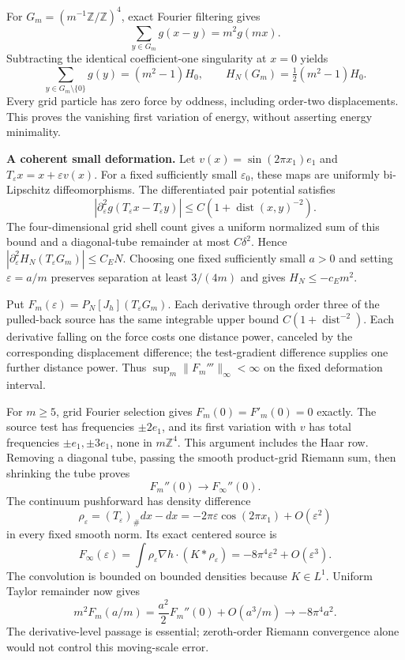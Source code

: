 \documentclass[11pt]{article}
\begin{document}
For $G_m=(m^{-1}\mathbb Z/\mathbb Z)^4$, exact Fourier filtering gives
\[
 \sum_{y\in G_m}g(x-y)=m^2g(mx).
\]
Subtracting the identical coefficient-one singularity at $x=0$ yields
\[
 \sum_{y\in G_m\setminus\{0\}}g(y)=(m^2-1)H_0,
 \qquad H_N(G_m)=\tfrac12(m^2-1)H_0.
\]
Every grid particle has zero force by oddness, including order-two displacements. This proves the vanishing first variation of energy, without asserting energy minimality.

\noindent\textbf{A coherent small deformation.}
Let $v(x)=\sin(2\pi x_1)e_1$ and $T_\varepsilon x=x+\varepsilon v(x)$. For a fixed sufficiently small $\varepsilon_0$, these maps are uniformly bi-Lipschitz diffeomorphisms. The differentiated pair potential satisfies
\[
 |\partial_\varepsilon^2g(T_\varepsilon x-T_\varepsilon y)|
 \le C(1+\operatorname{dist}(x,y)^{-2}).
\]
The four-dimensional grid shell count gives a uniform normalized sum of this bound and a diagonal-tube remainder at most $C\delta^2$. Hence $|\partial_\varepsilon^2H_N(T_\varepsilon G_m)|\le C_EN$. Choosing one fixed sufficiently small $a>0$ and setting $\varepsilon=a/m$ preserves separation at least $3/(4m)$ and gives $H_N\le-c_Em^2$.

Put $F_m(\varepsilon)=P_N[J_h](T_\varepsilon G_m)$. Each derivative through order three of the pulled-back source has the same integrable upper bound $C(1+\operatorname{dist}^{-2})$. Each derivative falling on the force costs one distance power, canceled by the corresponding displacement difference; the test-gradient difference supplies one further distance power. Thus $\sup_m\|F_m'''\|_\infty<\infty$ on the fixed deformation interval.

For $m\ge5$, grid Fourier selection gives $F_m(0)=F'_m(0)=0$ exactly. The source test has frequencies $\pm2e_1$, and its first variation with $v$ has total frequencies $\pm e_1,\pm3e_1$, none in $m\mathbb Z^4$. This argument includes the Haar row. Removing a diagonal tube, passing the smooth product-grid Riemann sum, then shrinking the tube proves
\[
 F_m''(0)\longrightarrow F_\infty''(0).
\]
The continuum pushforward has density difference
\[
 \rho_\varepsilon=(T_\varepsilon)_\#dx-dx
 =-2\pi\varepsilon\cos(2\pi x_1)+O(\varepsilon^2)
\]
in every fixed smooth norm. Its exact centered source is
\[
 F_\infty(\varepsilon)=\int\rho_\varepsilon\nabla h\cdot(K*\rho_\varepsilon)
 =-8\pi^4\varepsilon^2+O(\varepsilon^3).
\]
The convolution is bounded on bounded densities because $K\in L^1$. Uniform Taylor remainder now gives
\[
 m^2F_m(a/m)=\frac{a^2}{2}F_m''(0)+O(a^3/m)
 \longrightarrow-8\pi^4a^2.
\]
The derivative-level passage is essential; zeroth-order Riemann convergence alone would not control this moving-scale error.
\end{document}
